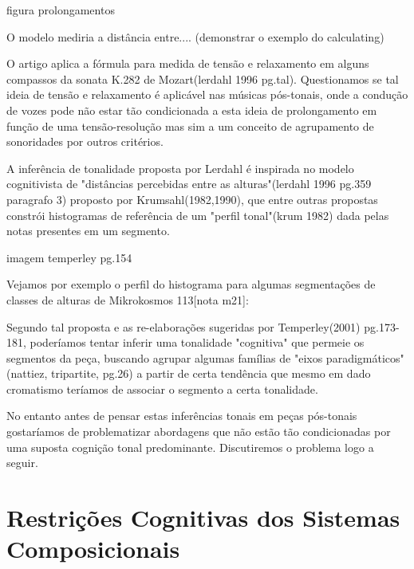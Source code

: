 \documentclass[
	12pt,				%
	openright,			%
	twoside,			%
	a4paper,			%
	english,			%
	french,				%
	spanish,			%
	brazil				%
	]{abntex2}
\begin{document}
figura prolongamentos


O modelo mediria a distância entre.... (demonstrar o exemplo do calculating)

O artigo aplica a fórmula para medida de tensão e relaxamento em alguns compassos da sonata K.282 de Mozart(lerdahl 1996 pg.tal). Questionamos se tal ideia de tensão e relaxamento é aplicável nas músicas pós-tonais, onde a condução de vozes pode não estar tão condicionada a esta ideia de prolongamento em função de uma tensão-resolução mas sim a um conceito de agrupamento de sonoridades por outros critérios. 

A inferência de tonalidade proposta por Lerdahl é inspirada no modelo cognitivista de "distâncias percebidas entre as alturas"(lerdahl 1996 pg.359 paragrafo 3) proposto por Krumsahl(1982,1990), que entre outras propostas constrói histogramas de referência de um "perfil tonal"(krum 1982) dada pelas notas presentes em um segmento.

imagem temperley pg.154



Vejamos por exemplo o perfil do histograma para algumas segmentações de classes de alturas de Mikrokosmos 113[nota m21]:




Segundo tal proposta e as re-elaborações sugeridas por Temperley(2001) pg.173-181, poderíamos tentar inferir uma tonalidade "cognitiva" que permeie os segmentos da peça, buscando agrupar algumas famílias de "eixos paradigmáticos"(nattiez, tripartite, pg.26) a partir de certa tendência que mesmo em dado cromatismo teríamos de associar o segmento a certa tonalidade.

No entanto antes de pensar estas inferências tonais em peças pós-tonais gostaríamos de problematizar abordagens que não estão tão condicionadas por uma suposta cognição tonal predominante. Discutiremos o problema logo a seguir.






\section{Restrições Cognitivas dos Sistemas Composicionais}
\end{document}
